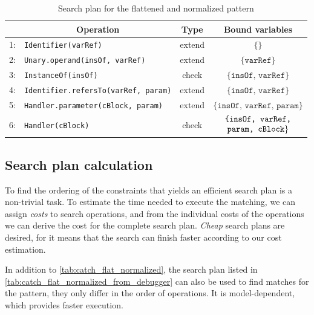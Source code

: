\begin{table}[h]
	\centering
	\begin{tabular}{c|l|c|c}
		\hline
		& \multicolumn{1}{|c|}{Operation} & Type & Bound variables \\ \hline
		1: & \texttt{Identifier(varRef)} & extend & $\{ \}$ \\
		2: & \texttt{Unary.operand(insOf, varRef)} & extend & $\{ \texttt{varRef} \}$\\
		3: & \texttt{InstanceOf(insOf)} & check & $\{ \texttt{insOf, varRef} \}$\\
		4: & \texttt{Identifier.refersTo(varRef, param)} & extend & $\{ \texttt{insOf, varRef} \}$\\
		5: & \texttt{Handler.parameter(cBlock, param)}  & extend & $\{ \texttt{insOf, varRef, param} \}$\\
		6: & \texttt{Handler(cBlock)}  & check & $ \stackedlines{ \texttt{\{insOf, varRef,}}{\texttt{param, cBlock}\}} $ \\
		
	\end{tabular}
	\caption{Search plan for the flattened and normalized pattern}
	\label{tab:catch_flat_normalized}
\end{table}




\subsection{Search plan calculation}

To find the ordering of the constraints that yields an efficient search plan is a non-trivial task. To estimate the time needed to execute the matching, we can assign \emph{costs} to search operations, and from the individual costs of the operations we can derive the cost for the complete search plan. \emph{Cheap} search plans are desired, for it means that the search can finish faster according to our cost estimation.

In addition to \autoref{tab:catch_flat_normalized}, the search plan listed in \autoref{tab:catch_flat_normalized_from_debugger} can also be used to find matches for the \catchproblem pattern, they only differ in the order of operations. It is model-dependent, which provides faster execution.

